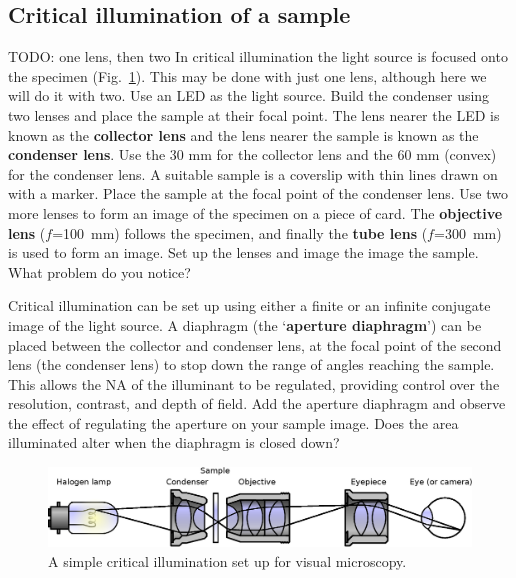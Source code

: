 \documentclass[a4paper]{report}
\begin{document}
\subsection{Critical illumination of a sample}
TODO: one lens, then two
In critical illumination the light source is focused onto the specimen (Fig.~\ref{critIlum}).
This may be done with just one lens, although here we will do it with two. 
Use an LED as the light source. 
Build the condenser using two lenses and place the sample at
their focal point. The lens nearer the LED is known as the
\textbf{collector lens} and the lens nearer the sample is known as the
\textbf{condenser lens}. Use the 30 mm for the collector lens and the
60 mm (convex) for the condenser lens. A suitable sample is a
coverslip with thin lines drawn on with a marker. Place the sample at
the focal point of the condenser lens. Use two more lenses to form an
image of the specimen on a piece of card. The \textbf{objective lens}
($f$=100~mm) follows the specimen, and finally the \textbf{tube lens}
($f$=300~mm) is used to form an image. Set up the lenses and image the
image the sample. What problem do you notice?

Critical illumination can be set up using either a finite or an
infinite conjugate image of the light source. A diaphragm (the
`\textbf{aperture diaphragm}') can be placed between the collector and
condenser lens, at the focal point of the second lens (the condenser
lens) to stop down the range of angles reaching the sample. This
allows the NA of the illuminant to be regulated, providing control
over the resolution, contrast, and depth of field. Add the aperture
diaphragm and observe the effect of regulating the aperture on your
sample image. Does the area illuminated alter when the diaphragm is
closed down?

\begin{figure}[h]
\center
\includegraphics[width=5in]{Critical_Illumination.eps}
\caption{A simple critical illumination set up for visual microscopy.}
\label{critIlum}
\end{figure}
\end{document}
